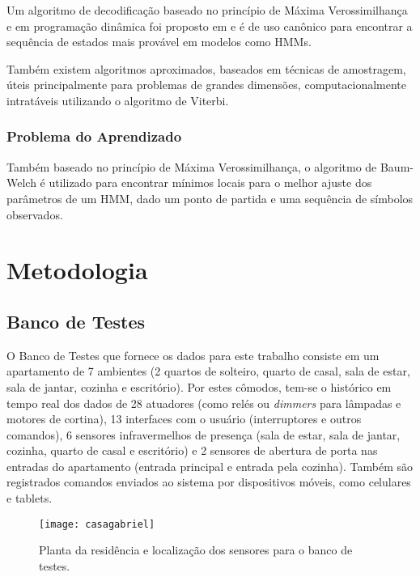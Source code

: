 \documentclass[
	12pt,				%
	openright,			%
	twoside,			%
	a4paper,			%
	english,			%
	spanish,			%
	brazil,				%
	]{abntex2}\usepackage[]{graphicx}\usepackage[]{color}
\begin{document}
Um algoritmo de decodificação baseado no princípio de Máxima Verossimilhança e em programação dinâmica foi proposto em \cite{viterbi1967error} e é de uso canônico para encontrar a sequência de estados mais provável em modelos como HMMs.

Também existem algoritmos aproximados, baseados em técnicas de amostragem, úteis principalmente para problemas de grandes dimensões, computacionalmente intratáveis utilizando o algoritmo de Viterbi.

\subsection{Problema do Aprendizado}

Também baseado no princípio de Máxima Verossimilhança, o algoritmo de Baum-Welch é utilizado para encontrar mínimos locais para o melhor ajuste dos parâmetros de um HMM, dado um ponto de partida e uma sequência de símbolos observados.


\chapter{Metodologia}

\section{Banco de Testes}

O Banco de Testes que fornece os dados para este trabalho consiste em um apartamento de 7 ambientes (2 quartos de solteiro, quarto de casal, sala de estar, sala de jantar, cozinha e escritório). Por estes cômodos, tem-se o histórico em tempo real dos dados de 28 atuadores (como relés ou \textit{dimmers} para lâmpadas e motores de cortina), 13 interfaces com o usuário (interruptores e outros comandos), 6 sensores infravermelhos de presença (sala de estar, sala de jantar, cozinha, quarto de casal e escritório) e 2 sensores de abertura de porta nas entradas do apartamento (entrada principal e entrada pela cozinha). Também são registrados comandos enviados ao sistema por dispositivos móveis, como celulares e tablets.

\begin{figure}[ht]
\centering
\texttt{[image: casagabriel]}
\caption{Planta da residência e localização dos sensores para o banco de testes.}
\label{casagabriel}
\end{figure}
\end{document}
